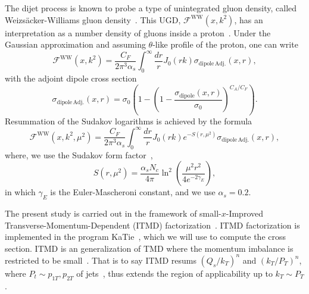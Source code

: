 \documentclass[12pt]{article}
\numberwithin{equation}{section}
\numberwithin{table}{section}
\numberwithin{figure}{section}
\newcommand{\fww}[0]{\mathcal{F}^{\mathrm{WW}}}
\newcommand{\sdp}[0]{\sigma_{\mathrm{dipole}}}
\newcommand{\sdpa}[0]{\sigma_{\mathrm{dipole\,Adj.}}}
\newcommand{\comment}[1]{\texttt{\color{red}#1}}
\begin{document}
The dijet process is known to probe a type of unintegrated gluon density, called Weizs\"acker-Williams gluon density~\cite{Dominguez:2010xd,Dominguez:2011wm,Xiao:2017ggh}.
This UGD, $\fww(x,k^2)$, has an interpretation as a number density of gluons inside a proton~\cite{Dominguez:2010xd,Dominguez:2011wm,Dominguez:2011wm}. Under the Gaussian approximation and assuming $\theta$-like profile of the proton, one can write~\cite{vanHameren:2016ftb,Xiao:2017ggh,Dominguez:2010xd,Dominguez:2011wm}
\begin{equation}
\fww(x,k^2)= \frac{C_F}{2\pi^3\alpha_s}\int^\infty_0\frac{dr}{r}J_0(r k) \sdpa(x,r),
\end{equation} 	
with the adjoint dipole cross section
\begin{equation}
\sdpa(x,r)=\sigma_0\left( 1-\left(1-\frac{\sdp(x,r)}{\sigma_0}\right)^{C_A/C_F}\right).
\label{eq:ww}
\end{equation}
Resummation of the Sudakov logarithms is achieved by the formula~\cite{Mueller:2013wwa,Xiao:2017yya}
\begin{equation}
	\fww(x,k^2,\mu^2)= \frac{C_F}{2\pi^3\alpha_s}\int^\infty_0\frac{dr}{r}J_0(r k) e^{-S(r,\mu^2)} \sdpa(x,r),
	\label{eq:ww-sud}
\end{equation}
where, we use the Sudakov form factor~\cite{Mueller:2013wwa,Xiao:2017yya},
\begin{equation}
	S(r,\mu^2)=\frac{\alpha_s N_c}{4\pi}\ln^2\left(\frac{\mu^2r^2}{4e^{-2\gamma_E}}\right),
\end{equation}
in which $\gamma_E$ is the Euler-Mascheroni constant, and we use $\alpha_s=0.2$. 
 

  
The present study is carried out in the framework of small-$x$-Improved Transverse-Momentum-Dependent (ITMD) factorization~\cite{Kotko:2015ura,vanHameren:2016ftb}.
ITMD factorization is implemented in the program KaTie~\cite{vanHameren:2016kkz}, which we will use to compute the cross section. 
ITMD is an generalization of TMD where the momentum imbalance is restricted to be small~\cite{Kotko:2015ura,vanHameren:2016ftb}. That is to say ITMD resums $(Q_s/k_T)^n$ and $(k_T/P_T)^n$, where $P_t\sim p_{1T},p_{2T}$ of jets~\cite{Kotko:2015ura,vanHameren:2016ftb}, thus extends the region of applicability up to $k_T\sim P_T$.

\end{document}

